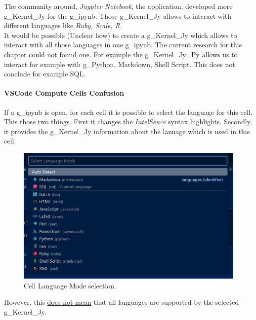 The community around, \textit{Juypter Notebook}, the application, developed more \gls{g_Kernel_Jy} for the \gls{g_ipynb}. Those \gls{g_Kernel_Jy} allows to interact with different languages like \textit{Ruby, Scale, R}.\\

It would be possible (Unclear how) to create a \gls{g_Kernel_Jy} which allows to interact with all those languages in one \gls{g_ipynb}. The current research for this chapter could not found one. For example the \gls{g_Kernel_Jy_Py} allows us to interact for example with \gls{g_Python}, Markdown, Shell Script. This does not conclude for example \gls{SQL}.

\paragraph{VSCode Compute Cells Confusion}
If a \gls{g_ipynb} is open, for each cell it is possible to select the language for this cell. This those two things. First it changes the \textit{IntelSence} syntax highlights. Secondly, it provides the \gls{g_Kernel_Jy} information about the lanuage which is used in this cell.

\begin{figure}[H]
	\centering
	\includegraphics[scale = 0.3]{attachment/chapter_AML/Scc007}
	\caption{Cell Language Mode selection.}
\end{figure}

However, this \underline{does not mean} that all languages are supported by the selected \gls{g_Kernel_Jy}. 

